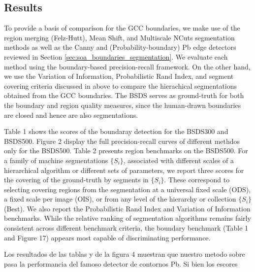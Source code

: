 \subsection{Results}
To provide a basis of comparison for the GCC boundaries, we make use of the region merging (Felz-Hutt), Mean Shift, and Multiscale NCuts segmentation methods as well as the Canny and (Probability-boundary) Pb edge detectors reviewed in Section \ref{sec:soa_boundaries_segmentation}. We evaluate each method using the boundary-based precision-recall framework. On the other hand, we use the Variation of Information, Probabilistic Rand Index, and segment covering criteria discussed in above to compare the hierachical segmentations obtained from the GCC boundaries. The BSDS serves as ground-truth for both the boundary and region quality measures, since the human-drawn boundaries are closed and hence are also segmentations.

Table 1 shows the scores of the boundaray detection for the BSDS300 and BSDS500. Figure 2 display the full precision-recall curves of different methdos only for the BSDS500. Table 2 presents region benchmarks on the BSDS500. For a family of machine segmentations $\{S_i\}$, associated with different scales of a hierarchical algorithm or different sets of parameters, we report three scores for the covering of the ground-truth by segments in $\{S_i\}$. These correspond to selecting covering regions from the segmentation at a universal fixed scale (ODS), a fixed scale per image (OIS), or from any level of the hierarchy or collection $\{S_i\}$ (Best). We also report the Probabilistic Rand Index and Variation of Information benchmarks. While the relative ranking of segmentation algorithms remains fairly consistent across different benchmark criteria, the boundary benchmark (Table 1 and Figure 17) appears most capable of discriminating performance.

Los resultados de las tablas y de la figura 4 muestran que nuestro metodo sobre pasa la performancia del famoso detector de contornos Pb. Si bien los escores 

